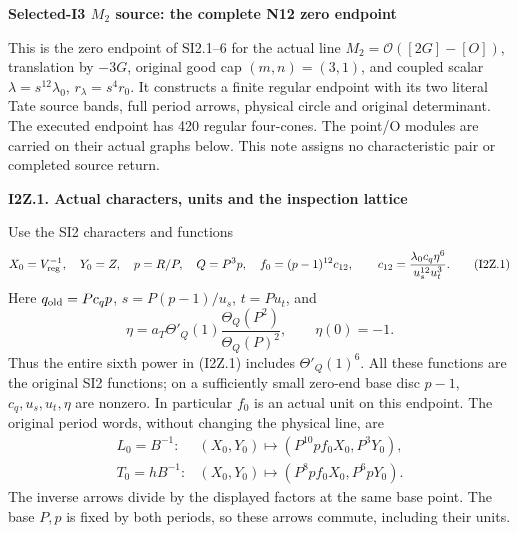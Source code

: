 \medskip\noindent\textbf{Selected-I3 \(M_{2}\) source: the complete N12 zero endpoint}

\par\nobreak

This is the zero endpoint of SI2.1--6 for the actual line
\(M_2=\mathcal O([2G]-[O])\), translation by \(-3G\), original good
cap \((m,n)=(3,1)\), and coupled scalar
\(\lambda=s^{12}\lambda _0\), \(r_\lambda=s^4r_0\).
It constructs a finite regular endpoint with its two literal Tate source
bands, full period arrows, physical circle and original determinant.
The executed endpoint has 420 regular four-cones. The point/O modules
are carried on their actual graphs below. This note assigns no
characteristic pair or completed source return.

\par

\medskip\noindent\textbf{I2Z.1. Actual characters, units and the inspection lattice}

\par\nobreak

Use the SI2 characters and functions
\[
 X_0=V_{\rm reg}^{-1},\quad Y_0=Z,\quad p=R/P,\quad
 Q=P^3p,\quad
 f_0=(p-1)^{12}c_{12},\qquad
 c_{12}=\frac{\lambda _0c_q\eta^6}{u_s^{12}u_t^3}.
 \tag{I2Z.1}
\]
Here \(q_{\rm old}=Pc_qp\), \(s=P(p-1)/u_s\), \(t=Pu_t\), and
\[
 \eta=a_T\Theta'_Q(1)\frac{\Theta_Q(P^2)}{\Theta_Q(P)^2},
 \qquad \eta(0)=-1.
 \tag{I2Z.2}
\]
Thus the entire sixth power in (I2Z.1) includes
\(\Theta'_Q(1)^6\). All these functions are the original SI2 functions;
on a sufficiently small zero-end base disc \(p-1\), \(c_q,u_s,u_t,\eta\)
are nonzero. In particular \(f_0\) is an actual unit on this endpoint.
The original period words, without changing the physical line, are
\[
\begin{aligned}
 L_0=B^{-1}:&(X_0,Y_0)\longmapsto
       (P^{10}pf_0X_0,P^3Y_0),\\
 T_0=hB^{-1}:&(X_0,Y_0)\longmapsto
       (P^8pf_0X_0,P^6pY_0).
\end{aligned}
\tag{I2Z.3}
\]
The inverse arrows divide by the displayed factors at the same base
point. The base \(P,p\) is fixed by both periods, so these arrows commute,
including their units.

